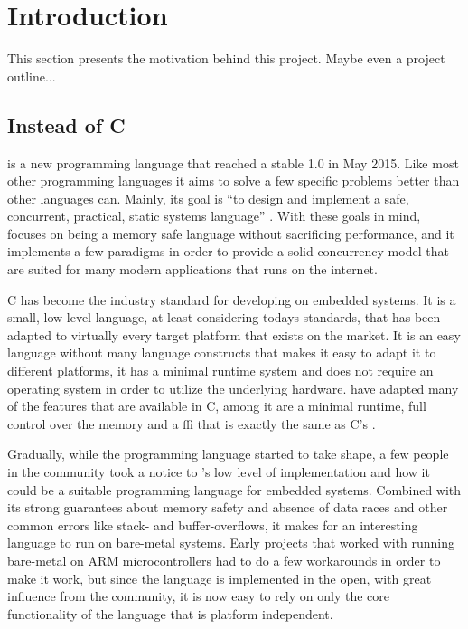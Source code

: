 
\chapter{Introduction}
\label{chap:intro}

This section presents the motivation behind this project.
Maybe even a project outline...

\section{\rust Instead of C} %
\label{sec:intro:rust_as_replacement_to_c}

\rust is a new programming language that reached a stable 1.0 in May 2015.
Like most other programming languages it aims to solve a few specific problems better than other languages can.
Mainly, its goal is ``to design and implement a safe, concurrent, practical, static systems language'' \cite{web:rust_faq}.
With these goals in mind, \rust focuses on being a memory safe language without sacrificing performance, and it implements a few paradigms in order to provide a solid concurrency model that are suited for many modern applications that runs on the internet.

C has become the industry standard for developing on embedded systems.
It is a small, low-level language, at least considering todays standards, that has been adapted to virtually every target platform that exists on the market.
It is an easy language without many language constructs that makes it easy to adapt it to different platforms, it has a minimal runtime system and does not require an operating system in order to utilize the underlying hardware.
\rust have adapted many of the features that are available in C, among it are a minimal runtime, full control over the memory and a \gls{ffi} that is exactly the same as C's \cite{web:rust_run_once_run_everywhere}.

Gradually, while the \rust programming language started to take shape, a few people in the community took a notice to \rust's low level of implementation and how it could be a suitable programming language for embedded systems.
Combined with its strong guarantees about memory safety and absence of data races and other common errors like stack- and buffer-overflows, it makes for an interesting language to run on bare-metal systems.
Early projects that worked with running \rust bare-metal on ARM microcontrollers had to do a few workarounds in order to make it work, but since the language is implemented in the open, with great influence from the community, it is now easy to rely on only the core functionality of the language that is platform independent.

